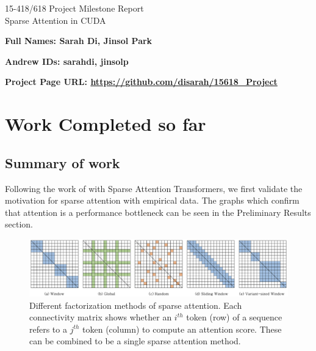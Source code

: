 \documentclass[11pt]{article}
\begin{document}
\begin{center}
\LARGE
15-418/618 \thisterm{} Project Milestone Report
\\ 
Sparse Attention in CUDA
\end{center}
\begin{flushright}
{\large\bf Full Names: Sarah Di, Jinsol Park\makebox[2in][l]{

}}

{\large\bf Andrew IDs: sarahdi, jinsolp\makebox[2in][l]{\tt

}}
\end{flushright}

{\large\bf Project Page URL: \url{https://github.com/disarah/15618\_Project}\makebox[2in][l]{

}}


\section{Work Completed so far}
\subsection{Summary of work}

Following the work of \citet{child2019generating} with Sparse Attention Transformers, we first validate the motivation for sparse attention with empirical data. The graphs which confirm that attention is a performance bottleneck can be seen in the Preliminary Results section.

\begin{figure}[h]
  \centering
  \includegraphics[width=170mm]{figures/building_block.png}
  \caption{Different factorization methods of sparse attention.  Each connectivity matrix shows whether an $i^{th}$ token (row) of a sequence refers to a $j^{th}$ token (column) to compute an attention score. These can be combined to be a single sparse attention method.}
 \label{fig:bulding_block}
\end{figure}
\end{document}
